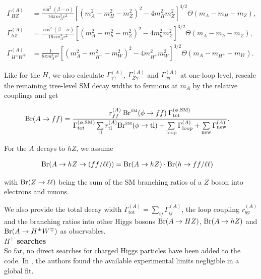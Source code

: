 \documentclass[preprint,3p,12pt]{elsarticle}
\begin{document}
\begin{align}
 \Gamma ^{(A)}_{HZ} &= \frac{\sin^2 (\beta -\alpha )}{16 \pi m_A^3 v^2} \left[ (m_A^2-m_H^2-m_Z^2)^2-4 m_H^2 m_Z^2\right] ^{3/2}  \Theta (m_A-m_H-m_Z), \nonumber \\
 \Gamma ^{(A)}_{hZ} &= \frac{\cos^2 (\beta -\alpha )}{16 \pi m_A^3 v^2} \left[ (m_A^2-m_h^2-m_Z^2)^2-4 m_h^2 m_Z^2\right] ^{3/2}  \Theta (m_A-m_h-m_Z), \nonumber \\
 \Gamma ^{(A)}_{H^\pm W^\mp } &= \frac{1}{8 \pi m_A^3 v^2} \left[ (m_A^2-m_{H^+}^2-m_W^2)^2-4 m_{H^+}^2 m_W^2\right] ^{3/2}  \Theta (m_A-m_{H^+}-m_W). \nonumber
\end{align}

Like for the $H$, we also calculate $\Gamma_{\gamma \gamma}^{(A)}$, $\Gamma_{Z \gamma}^{(A)}$ and $\Gamma_{gg}^{(A)}$ at one-loop level, rescale the remaining tree-level SM decay widths to fermions at $m_A$ by the relative couplings and get

\begin{align}
 {\rm Br}(A\to ff) &= \frac{r_{ff}^{(A)} \: {\rm Br}^{\text{\tiny{SM}}} (\phi \to ff) \: \Gamma^{(\phi ,\text{SM})}_{\text{tot}}}{\Gamma^{(\phi ,\text{SM})}_{\text{tot}} \sum\limits_{\rm tl} r_{\rm tl}^{(A)} {\rm Br}^{\text{\tiny{SM}}} (\phi \to {\rm tl}) + \sum\limits_{\rm loop} \Gamma_{\rm loop}^{(A)} + \sum\limits_{\rm new} \Gamma_{\rm new}^{(A)}} \nonumber .
\end{align}

For the $A$ decays to $hZ$, we assume

\begin{align}
 {\rm Br}(A\to hZ\to (ff / \ell \ell )) &=  {\rm Br}(A\to hZ)  \cdot {\rm Br}(h\to ff / \ell \ell )\nonumber 
\end{align}

with ${\rm Br}(Z\to \ell \ell )$ being the sum of the SM branching ratios of a $Z$ boson into electrons and muons.

We also provide the total decay width $\Gamma^{(A)}_{\text{tot}}=\sum_{ij}\Gamma_{ij}^{(A)}$, the loop coupling $r_{gg}^{(A)}$ and the branching ratios into other Higgs bosons ${\rm Br}(A\to HZ)$, ${\rm Br}(A\to hZ)$ and ${\rm Br}(A\to H^\pm W^\mp)$ as observables.\\

\textbf{$H^+$ searches}\\

So far, no direct searches for charged Higgs particles have been added to the code. In \cite{Chowdhury:2015yja}, the authors found the available experimental limits negligible in a global fit.
\end{document}
